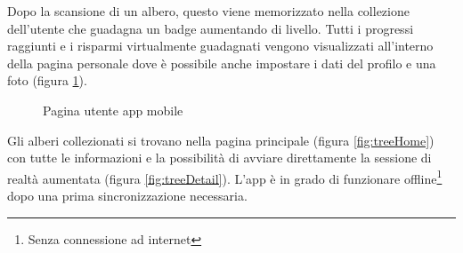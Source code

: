 Dopo la scansione di un albero, questo viene memorizzato nella collezione dell'utente che guadagna un badge aumentando di livello. Tutti i progressi raggiunti e i risparmi virtualmente guadagnati vengono visualizzati all'interno della pagina personale dove è possibile anche impostare i dati del profilo e una foto (figura \ref{fig:userPage}).

\begin{figure}
    \centering
    \caption{Pagina utente app mobile}
    \label{fig:userPage}
\end{figure}

Gli alberi collezionati si trovano nella pagina principale (figura \ref{fig:treeHome}) con tutte le informazioni e la possibilità di avviare direttamente la sessione di realtà aumentata (figura \ref{fig:treeDetail}).
L'app è in grado di funzionare offline\footnote{Senza connessione ad internet} dopo una prima sincronizzazione necessaria.

